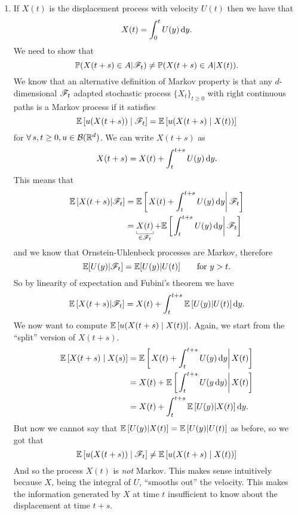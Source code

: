 \documentclass[12pt]{article}
\begin{document}
\begin{enumerate}
\item If $X(t)$ is the displacement process with velocity $U(t)$ then we have that
\begin{equation*}
	X(t)=\int_{0}^{t}U(y)\mathop{}\!\mathrm{d} y.
\end{equation*}
We need to show that 
\begin{equation*}
	\mathbb{P}(X(t+s)\in A|\mathscr{F}_{t})\neq\mathbb{P}(X(t+s)\in A|X(t)).
\end{equation*}
We know that an alternative definition of Markov property is that any $d$-dimensional $\mathscr{F}_{t}$ adapted stochastic process ${\{X_{t}\}}_{t\geq0}$ with right continuous paths is a Markov process if it satisfies
\begin{equation*}
	\mathbb{E}\left[u(X(t+s))\mid\mathscr{F}_{t}\right]=\mathbb{E}\left[u(X(t+s)\mid X(t))\right]
\end{equation*}
for $\forall\, s,t\geq0, u\in\mathcal{B}(\mathbb{R}^{d})$.
We can write $X(t+s)$ as 
\begin{equation*}
	X(t+s)=X(t)+\int_{t}^{t+s}U(y)\mathop{}\!\mathrm{d} y.
\end{equation*}
This means that 
\begin{align*}
	\ev\left[X(t+s)|\F_{t}\right]&=\ev\left[\left.X(t)+\int_{t}^{t+s}U(y)\dy\right|\F_{t}\right]\\
	&=\ubracketthin{X(t)}_{\mathclap{\in  \F_{t}}}+\ev\left[\left.\int_{t}^{t+s}U(y)\dy\right|\F_{t}\right]
\end{align*}
and we know that Ornstein-Uhlenbeck processes are Markov, therefore
\begin{equation*}
	\mathbb{E}[U(y)|\mathscr{F}_{t}]=\mathbb{E}[U(y)|U(t)]\qquad\text{for }y>t.
\end{equation*}
So by linearity of expectation and Fubini's theorem we have
\begin{equation*}
	\mathbb{E}\left[X(t+s)|\mathscr{F}_{t}\right]=X(t)+\int_{t}^{t+s}\mathbb{E}\left[U(y)|U(t)\right]\mathop{}\!\mathrm{d} y.
\end{equation*}
We now want to compute $\mathbb{E}\left[u(X(t+s)\mid X(t))\right]$. Again, we start from the ``split'' version of $X(t+s)$.
\begin{align*}
	\mathbb{E}\left[X(t+s)\mid X(s)\right]&=\mathbb{E}\left[\left.X(t)+\int_{t}^{t+s}U(y)\mathop{}\!\mathrm{d} y\right|X(t)\right]\\
	&=X(t)+\mathbb{E}\left[\left.\int_{t}^{t+s}U(y\mathop{}\!\mathrm{d} y)\right|X(t)\right]\\
	&=X(t)+\int_{t}^{t+s}\mathbb{E}\left[U(y)|X(t)\right]\mathop{}\!\mathrm{d} y.
\end{align*}
But now we cannot say that $\mathbb{E}\left[U(y)|X(t)\right]=\mathbb{E}\left[U(y)|U(t)\right]$ as before, so we got that 
\begin{equation*}
	\mathbb{E}\left[u(X(t+s))\mid\mathscr{F}_{t}\right]\neq\mathbb{E}\left[u(X(t+s)\mid X(t))\right]
\end{equation*}
And so the process $X(t)$ is \textit{not} Markov. This makes sense intuitively because $X$, being the integral of $U$, ``smooths out'' the velocity. This makes the information generated by $X$ at time $t$ insufficient to know about the displacement at time $t+s$.
	\end{enumerate}
	
\end{document}
